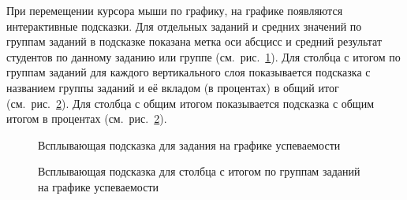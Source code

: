 При перемещении курсора мыши по графику, на графике появляются интерактивные подсказки.
Для отдельных заданий и средних значений по группам заданий в подсказке показана метка оси абсцисс
и средний результат студентов по данному заданию или группе (см.\ рис.~\ref{analytics:progress:chart:tooltip:individual}).
Для столбца с итогом по группам заданий для каждого вертикального слоя показывается подсказка
с названием группы заданий и её вкладом (в процентах) в общий итог (см.\ рис.~\ref{analytics:progress:chart:tooltip:avg_group}).
Для столбца с общим итогом показывается подсказка
с общим итогом в процентах (см.\ рис.~\ref{analytics:progress:chart:tooltip:avg_group}).


\begin{figure}[H]
	\caption{Всплывающая подсказка для задания на графике успеваемости}
	\label{analytics:progress:chart:tooltip:individual}
\end{figure}


\begin{figure}[H]
	\caption{Всплывающая подсказка для столбца с итогом по группам заданий на графике успеваемости}
	\label{analytics:progress:chart:tooltip:avg_group}
\end{figure}


